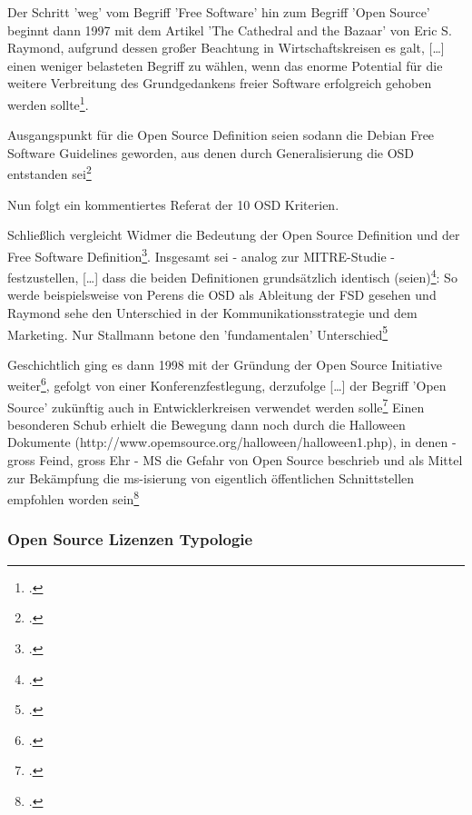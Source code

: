 \documentclass[DIV=calc,BCOR=5mm,11pt,headings=small,oneside,abstract=true, toc=bib]{scrartcl}
\begin{document}
Der Schritt 'weg' vom Begriff 'Free Software' hin zum Begriff 'Open Source'
beginnt dann 1997 mit dem Artikel 'The Cathedral and the Bazaar' von Eric S.
Raymond, aufgrund dessen großer Beachtung in Wirtschaftskreisen es galt,
\glqq{}[\ldots] einen weniger belasteten Begriff zu wählen\grqq{}, wenn das
\glqq{}enorme Potential für die weitere Verbreitung des Grundgedankens freier
Software\glqq{} erfolgreich gehoben werden
sollte\footcite[vgl.][19]{Widmer2003a}.

Ausgangspunkt für die Open Source Definition seien sodann die
\glqq{}Debian Free Software Guidelines\grqq{} geworden, aus denen durch
Generalisierung die OSD entstanden sei\footcite[vgl.][20]{Widmer2003a}

Nun folgt ein kommentiertes Referat der 10 OSD Kriterien.

Schließlich vergleicht Widmer die Bedeutung der Open Source Definition und der
Free Software Definition\footcite[vgl.][28 - Zur Erinnerung: beiden gemeinsam
ist, dass sie notwendige Kriterien von Lizenzmodellen spezifzieren, sie selbst
geben keine Handlungsanleitungen zur Umsetzung. Das tun die Lizenzen. Deshalb
können auch nur aus den Lizenzen selbst jeweils abgeleitet werden, was konkret
zu deren Erfüllung zu tun ist.]{Widmer2003a}. Insgesamt sei - analog zur
MITRE-Studie - festzustellen, \glqq{}[\ldots] dass die beiden Definitionen
grundsätzlich identisch (seien)\grqq{}\footcite[vgl.][28]{Widmer2003a}: So werde
beispielsweise von Perens die OSD als Ableitung der FSD gesehen und Raymond sehe
den Unterschied in der Kommunikationsstrategie und dem Marketing. Nur Stallmann
betone den 'fundamentalen' Unterschied\footcite[vgl.][29]{Widmer2003a}
 
 Geschichtlich ging es dann 1998 mit der Gründung der Open Source Initiative
 weiter\footcite[vgl.][29]{Widmer2003a}, gefolgt von einer Konferenzfestlegung,
 derzufolge \glqq{} [\ldots] der Begriff 'Open Source' zukünftig auch in
 Entwicklerkreisen verwendet werden solle\footcite[vgl.][30
 originalquelle http://press.oreilly.com/pub/pr/796]{Widmer2003a} Einen
 besonderen Schub erhielt die Bewegung dann noch durch die Halloween Dokumente
 (http://www.opemsource.org/halloween/halloween1.php), in denen - gross Feind,
 gross Ehr - MS die Gefahr von Open Source beschrieb und als Mittel zur
 Bekämpfung die ms-isierung von eigentlich öffentlichen Schnittstellen empfohlen
 worden sein\footcite[vgl.][30]{Widmer2003a}
 
 \subsubsection{Open Source Lizenzen Typologie}
 
\end{document}
